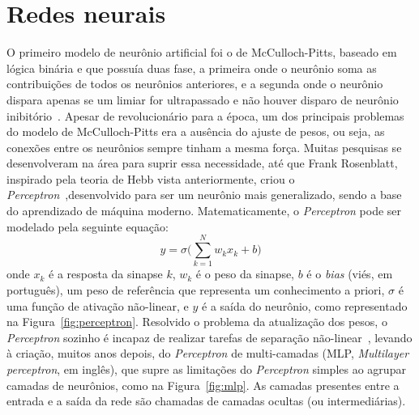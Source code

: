 \section{Redes neurais}\label{sec:redesneurais}
O primeiro modelo de neurônio artificial foi o de McCulloch-Pitts, baseado em lógica binária e que possuía duas fase, a primeira onde o neurônio soma as contribuições de todos os neurônios anteriores, e a segunda onde o neurônio dispara apenas se um limiar for ultrapassado e não houver disparo de neurônio inibitório~\cite{mcculloch_logical_1943}. Apesar de revolucionário para a época, um dos principais problemas do modelo de McCulloch-Pitts era a ausência do ajuste de pesos, ou seja, as conexões entre os neurônios sempre tinham a mesma força. Muitas pesquisas se desenvolveram na área para suprir essa necessidade, até que Frank Rosenblatt, inspirado pela teoria de Hebb vista anteriormente, criou o \textit{Perceptron}~\cite{rosenblatt_perceptron_1958},desenvolvido para ser um neurônio mais generalizado, sendo a base do aprendizado de máquina moderno. Matematicamente, o \textit{Perceptron} pode ser modelado pela seguinte equação:
\begin{equation}\label{eq:perceptron}
	y=\sigma\Big(\sum_{k=1}^Nw_kx_k+b\Big)
\end{equation}
onde $x_k$ é a resposta da sinapse $k$, $w_k$ é o peso da sinapse, $b$ é o \textit{bias} (viés, em português), um peso de referência que representa um conhecimento a priori, %
$\sigma$ é uma função de ativação não-linear, e $y$ é a saída do neurônio, como representado na Figura~\ref{fig:perceptron}. Resolvido o problema da atualização dos pesos, o \textit{Perceptron} sozinho é incapaz de realizar tarefas de separação não-linear~\cite{minsky_perceptrons_2017}, levando à criação, muitos anos depois, do \textit{Perceptron} de multi-camadas (MLP, \textit{Multilayer perceptron}, em inglês), que supre as limitações do \textit{Perceptron} simples ao agrupar camadas de neurônios, como na Figura~\ref{fig:mlp}. As camadas presentes entre a entrada e a saída da rede são chamadas de camadas ocultas (ou intermediárias).
